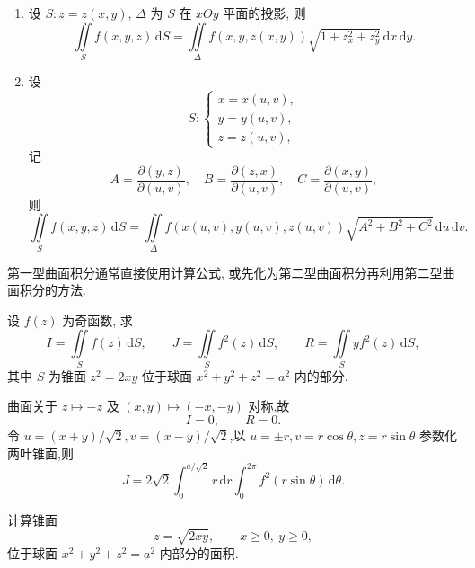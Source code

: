 \begin{theorem}[\markstar]
    \begin{enumerate}
        \item 设 $S:z=z(x,y)$, $\Delta$ 为 $S$ 在 $xOy$ 平面的投影, 则
              \[
                  \iint\limits_S f(x,y,z)\,\mathrm{d}S
                  =\iint\limits_\Delta f(x,y,z(x,y))\sqrt{1+z_x^2+z_y^2}\,\mathrm{d}x\,\mathrm{d}y.
              \]
        \item 设
              \[
                  S:\begin{cases}
                      x=x(u,v), \\
                      y=y(u,v), \\
                      z=z(u,v),
                  \end{cases}
              \]
              记
              \[
                  A=\dfrac{\partial(y,z)}{\partial(u,v)},\quad
                  B=\dfrac{\partial(z,x)}{\partial(u,v)},\quad
                  C=\dfrac{\partial(x,y)}{\partial(u,v)},
              \]
              则
              \[
                  \iint\limits_Sf(x,y,z)\,\mathrm{d}S
                  =\iint\limits_\Delta f(x(u,v),y(u,v),z(u,v))\sqrt{A^2+B^2+C^2}\,\mathrm{d}u\,\mathrm{d}v.
              \]
    \end{enumerate}
\end{theorem}

\begin{remark}
    第一型曲面积分通常直接使用计算公式, 或先化为第二型曲面积分再利用第二型曲面积分的方法.
\end{remark}

\begin{example}
    设 $f(z)$ 为奇函数, 求
    \[
        I=\iint\limits_Sf(z)\,\mathrm{d}S,\qquad
        J=\iint\limits_Sf^2(z)\,\mathrm{d}S,\qquad
        R=\iint\limits_Syf^2(z)\,\mathrm{d}S,
    \]
    其中 $S$ 为锥面 $z^2=2xy$ 位于球面 $x^2+y^2+z^2=a^2$ 内的部分.
\end{example}
\exampleblank

\begin{solution}
    曲面关于 $z\mapsto-z$ 及 $(x,y)\mapsto(-x,-y)$ 对称,故
    \[
        I=0,\qquad R=0.
    \]
    令 $u=(x+y)/\sqrt{2},v=(x-y)/\sqrt{2}$,以
    $u=\pm r,v=r\cos\theta,z=r\sin\theta$ 参数化两叶锥面,则
    \[
        J=2\sqrt{2}\int_0^{a/\sqrt{2}}\!r\,\mathrm{d}r
        \int_0^{2\pi}f^2(r\sin\theta)\,\mathrm{d}\theta.
    \]
\end{solution}

\begin{example}
    计算锥面
    \[
        z=\sqrt{2xy},\qquad x\geq0,\ y\geq0,
    \]
    位于球面 $x^2+y^2+z^2=a^2$ 内部分的面积.
\end{example}
\exampleblank

